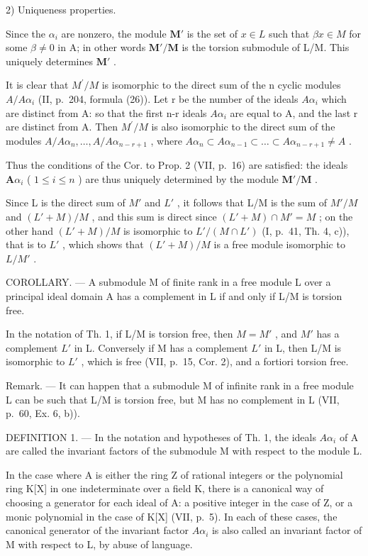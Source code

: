 2) Uniqueness properties.

Since the \(\alpha_{i}\) are nonzero, the module \(\mathbf{M}'\) is the set of \(x\in L\) such that \(\beta x\in M\) for some \(\beta \neq 0\) in A; in other words \(\mathbf{M}' / \mathbf{M}\) is the torsion submodule of L/M. This uniquely determines \(\mathbf{M}'\) .

It is clear that \(M^{\prime}/M\) is isomorphic to the direct sum of the n cyclic modules \(A/A\alpha_{i}\) (II, p.~204, formula (26)). Let r be the number of the ideals \(A\alpha_{i}\) which are distinct from A: so that the first n-r ideals \(A\alpha_{i}\) are equal to A, and the last r are distinct from A. Then \(M^{\prime}/M\) is also isomorphic to the direct sum of the modules \(A/A\alpha_{n}, \ldots, A/A\alpha_{n-r+1}\) , where \(A\alpha_{n} \subset A\alpha_{n-1} \subset \ldots \subset A\alpha_{n-r+1} \neq A\) .

Thus the conditions of the Cor. to Prop. 2 (VII, p.~16) are satisfied: the ideals \(\mathbf{A}\alpha_{i}\) ( \(1 \leqslant i \leqslant n\) ) are thus uniquely determined by the module \(\mathbf{M}'/\mathbf{M}\) .

Since L is the direct sum of \(M'\) and \(L'\) , it follows that L/M is the sum of \(M'/M\) and \((L'+M)/M\) , and this sum is direct since \((L'+M) \cap M' = M\) ; on the other hand \((L'+M)/M\) is isomorphic to \(L'/(M \cap L')\) (I, p.~41, Th. 4, c)), that is to \(L'\) , which shows that \((L'+M)/M\) is a free module isomorphic to \(L/M'\) .

COROLLARY. --- A submodule M of finite rank in a free module L over a principal ideal domain A has a complement in L if and only if L/M is torsion free.

In the notation of Th. 1, if L/M is torsion free, then \(M = M'\) , and \(M'\) has a complement \(L'\) in L. Conversely if M has a complement \(L'\) in L, then L/M is isomorphic to \(L'\) , which is free (VII, p.~15, Cor. 2), and a fortiori torsion free.

Remark. --- It can happen that a submodule M of infinite rank in a free module L can be such that L/M is torsion free, but M has no complement in L (VII, p.~60, Ex. 6, b)).

DEFINITION 1. --- In the notation and hypotheses of Th. 1, the ideals \(A\alpha_{i}\) of A are called the invariant factors of the submodule M with respect to the module L.

In the case where A is either the ring Z of rational integers or the polynomial ring K{[}X{]} in one indeterminate over a field K, there is a canonical way of choosing a generator for each ideal of A: a positive integer in the case of Z, or a monic polynomial in the case of K{[}X{]} (VII, p.~5). In each of these cases, the canonical generator of the invariant factor \(A\alpha_{i}\) is also called an invariant factor of M with respect to L, by abuse of language.

